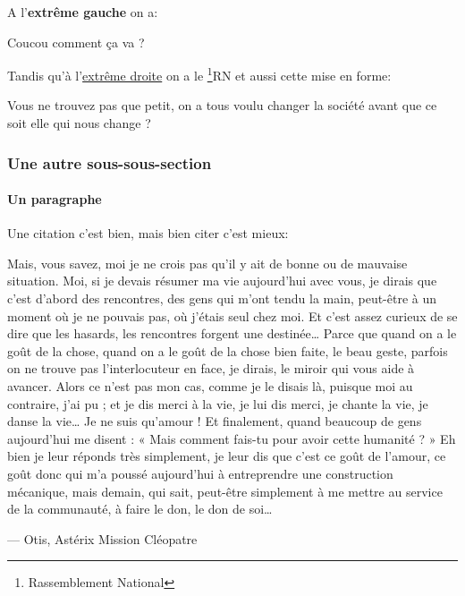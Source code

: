 A l'\textbf{extrême gauche} on a:
\begin{flushleft}
    Coucou comment ça va ?
\end{flushleft}

Tandis qu'à l'\underline{extrême droite} on a le \href{https://rassemblementnational.fr/}{\footnote{Rassemblement National}{RN}} et aussi cette mise en forme:

\begin{flushright}
    Vous ne trouvez pas que petit, on a tous voulu changer la société avant que ce soit elle qui nous change ?
\end{flushright}

\subsubsection{Une autre sous-sous-section}
\paragraph{Un paragraphe}
Une citation c'est bien, mais bien citer c'est mieux: 
\begin{quoting}
    Mais, vous savez, moi je ne crois pas qu’il y ait de bonne ou de mauvaise situation. Moi, si je devais résumer ma vie aujourd’hui avec vous, je dirais que c’est d’abord des rencontres, des gens qui m’ont tendu la main, peut-être à un moment où je ne pouvais pas, où j’étais seul chez moi. Et c’est assez curieux de se dire que les hasards, les rencontres forgent une destinée… Parce que quand on a le goût de la chose, quand on a le goût de la chose bien faite, le beau geste, parfois on ne trouve pas l’interlocuteur en face, je dirais, le miroir qui vous aide à avancer. Alors ce n’est pas mon cas, comme je le disais là, puisque moi au contraire, j’ai pu ; et je dis merci à la vie, je lui dis merci, je chante la vie, je danse la vie… Je ne suis qu’amour ! Et finalement, quand beaucoup de gens aujourd’hui me disent : « Mais comment fais-tu pour avoir cette humanité ? » Eh bien je leur réponds très simplement, je leur dis que c’est ce goût de l’amour, ce goût donc qui m’a poussé aujourd’hui à entreprendre une construction mécanique, mais demain, qui sait, peut-être simplement à me mettre au service de la communauté, à faire le don, le don de soi…
    \begin{flushright}
        --- Otis, Astérix Mission Cléopatre
    \end{flushright} 
\end{quoting}

